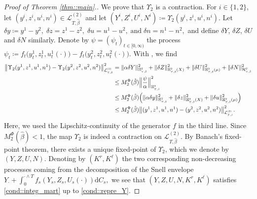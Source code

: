 \documentclass[10pt]{article} %
\newcommand\cH{\mathcal H}
\newcommand\cL{\mathcal L}
\newcommand{\smalltext}[1]{\text{\fontsize{4}{4}\selectfont$#1$}}
\def \H{\mathbb{H}}
\newcommand{\1}{\mathbf{1}}
\def\d{\mathrm{d}}
\begin{document}
\begin{proof}[Proof of Theorem \ref{thm::main}.]
	\medskip
	We prove that $\Upsilon_2$ is a contraction. For $i \in \{1,2\}$, let $(y^i,z^i,u^i,n^i) \in \cL^{(2)}_{T,\hat\beta}$ and let $(Y^i, Z^i,U^i,N^i) \coloneqq \Upsilon_2(y^i,z^i,u^i,n^i)$. Let $\delta y \coloneqq y^1 - y^2, \; \delta z = z^1 - z^2, \; \delta u = u^1 - u^2 ,\; \text{and} \; \delta n = n^1 - n^2,$
	and define $\delta Y$, $\delta Z$, $\delta U$ and $\delta N$ similarly. Denote by $\psi = (\psi_t)_{t \in [0,\infty)}$ the process $\psi_t \coloneqq f_t \big(y^1_t,z^1_t,u^1_t(\cdot)\big) - f_t\big(y^2_t,z^2_t,u^2_t(\cdot)\big).$ With , we find
	\begin{align*}
		\big\| \Upsilon_2(y^1,z^1,u^1,n^1) - \Upsilon_2(y^2,z^2,u^2,n^2) \big\|^2_{\cL^\smalltext{(2)}_{\smalltext{T}\smalltext{,}\smalltext{\hat\beta}}} 
		&= \|\alpha\delta Y\|^2_{\H^\smalltext{2}_{\smalltext{T}\smalltext{,}\smalltext{\hat\beta}}} + \|\delta Z\|^2_{\H^\smalltext{2}_{\smalltext{T}\smalltext{,}\smalltext{\hat\beta}}(X)} + \|\delta U\|^2_{\H^\smalltext{2}_{\smalltext{T}\smalltext{,}\smalltext{\hat\beta}}(\mu)} + \|\delta N\|^2_{\cH^{\smalltext{2}}_{\smalltext{T}\smalltext{,}\smalltext{\hat\beta}}} \nonumber\\
		&\leq M^\Phi_2(\hat\beta) \Big\| \frac{\psi}{\alpha} \Big\|^2_{\H^\smalltext{2}_{\smalltext{T}\smalltext{,}\smalltext{\hat\beta}}} \nonumber\\
		&\leq M^\Phi_2(\hat\beta) \Big( \|\alpha\delta y\|^2_{\H^\smalltext{2}_{\smalltext{T}\smalltext{,}\smalltext{\hat\beta}}} + \|\delta z\|^2_{\H^\smalltext{2}_{\smalltext{T}\smalltext{,}\smalltext{\hat\beta}}(X)} + \|\delta u\|^2_{\H^\smalltext{2}_{\smalltext{T}\smalltext{,}\smalltext{\hat\beta}}(\mu)} \Big)  \nonumber\\
		&\leq M^\Phi_2(\hat\beta) \big\|(y^1, z^1, u^1, n^1) - (y^2, z^2, u^2, n^2)\big\|^2_{\cL^\smalltext{(2)}_{\smalltext{T}\smalltext{,}\smalltext{\hat\beta}}}.
	\end{align*}
	Here, we used the Lipschitz-continuity of the generator $f$ in the third line. Since $M^\Phi_2(\hat\beta) < 1$, the map $\Upsilon_2$ is indeed a contraction on $\cL^{(2)}_{T,\hat\beta}$. By Banach's fixed-point theorem, there exists a unique fixed-point of $\Upsilon_2$, which we denote by $(Y,Z,U,N)$. Denoting by $(K^r,K^\ell)$ the two corresponding non-decreasing processes coming from the decomposition of the Snell envelope $Y_\cdot + \int_0^{\cdot \land T} f_s(Y_s,Z_s,U_s(\cdot))\d C_s,$ we see that $(Y,Z,U,N,K^r,K^\ell)$ satisfies \ref{cond::integ_mart} up to \ref{cond::repre_Y}. 
	

\end{proof}
\end{document}
